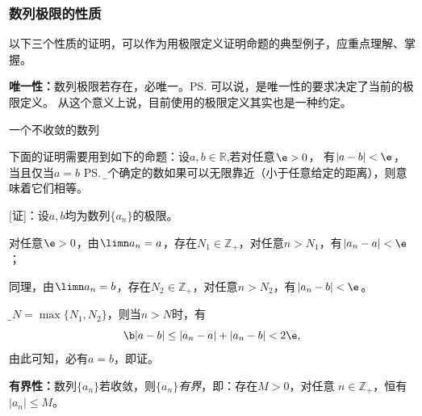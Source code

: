 \subsubsection{数列极限的性质}

以下三个性质的证明，可以作为用极限定义证明命题的典型例子，应重点理解、掌握。

{\bf 唯一性：}数列极限若存在，必唯一。\ps{可以说，是唯一性的要求决定了当前的极限定义。
从这个意义上说，目前使用的极限定义其实也是一种约定。}

\begin{center}
	
	一个不收敛的数列
\end{center}

下面的证明需要用到如下的命题：设$a,b\in\mathbb{R}$,若对任意$\e>0$，
有$|a-b|<\e$，当且仅当$a=b$
\ps{\b 两个确定的数如果可以无限靠近（小于任意给定的距离），则意味着它们相等。}

[证]：设$a,b$均为数列$\{a_n\}$的极限。

对任意$\e>0$，由$\limn a_n=a$，存在$N_1\in\mathbb{Z}_+$，对任意$n>N_1$，有$|a_n-a|<\e$；

同理，由$\limn a_n=b$，存在$N_2\in\mathbb{Z}_+$，对任意$n>N_2$，有$|a_n-b|<\e$。

令{\b $N=\max\{N_1,N_2\}$}，则当$n>N$时，有
$${\b |a-b|\leq|a_n-a|+|a_n-b|<2\e},$$
由此可知，必有$a=b$，即证。

{\bf 有界性：}数列$\{a_n\}$若收敛，则{\it $\{a_n\}$有界}，即：存在$M>0$，对任意
$n\in\mathbb{Z}_+$，恒有$|a_n|\leq M$。

